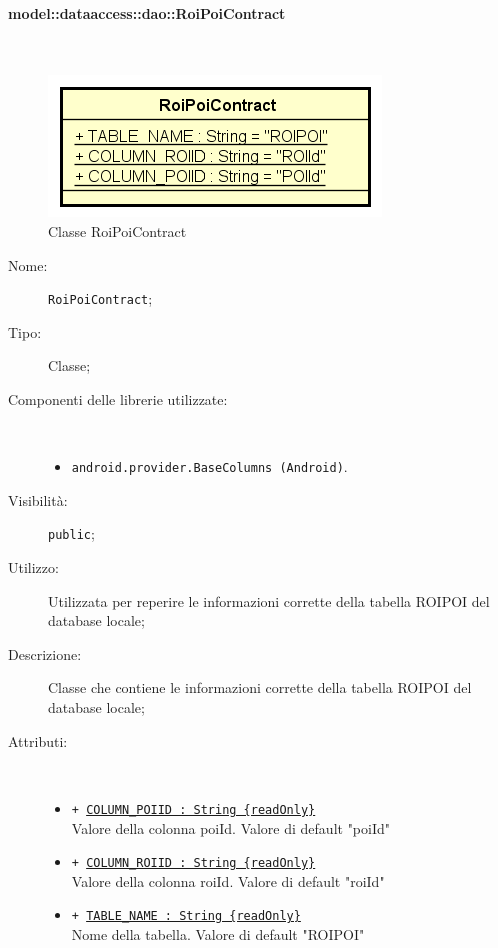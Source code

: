 \documentclass[../DefinizioneDiProdotto.tex]{subfiles}
\begin{document}
\paragraph{model::dataaccess::dao::RoiPoiContract}
\
\begin{figure}[H]
	\centering
	\includegraphics[width=\maxwidth]{img/RoiPoiContract.png}
	\caption{Classe RoiPoiContract}\label{fig:model::dataaccess::dao::RoiPoiContract} 
\end{figure}
\begin{description}
	\item[Nome:] \texttt{RoiPoiContract};
	\item[Tipo:] Classe;
	\item[Componenti delle librerie utilizzate:] \
	\begin{itemize}
		\item \texttt{android.provider.BaseColumns (Android)}.
		
	\end{itemize}
	\item[Visibilità:] \texttt{public};
	\item[Utilizzo:] Utilizzata per reperire le informazioni corrette della tabella ROIPOI del database locale;
	\item[Descrizione:] Classe che contiene le informazioni corrette della tabella ROIPOI del database locale;
	\item[Attributi:] \
	\begin{itemize}
		\item \texttt{+ \underline{COLUMN\_POIID : String \{readOnly\}}}\\
		Valore della colonna poiId. Valore di default "poiId"
		
		\item \texttt{+ \underline{COLUMN\_ROIID : String \{readOnly\}}}\\
		Valore della colonna roiId. Valore di default "roiId"
		
		\item \texttt{+ \underline{TABLE\_NAME : String \{readOnly\}}}\\
		Nome della tabella. Valore di default "ROIPOI"
		
	\end{itemize}
\end{description}
\end{document}
